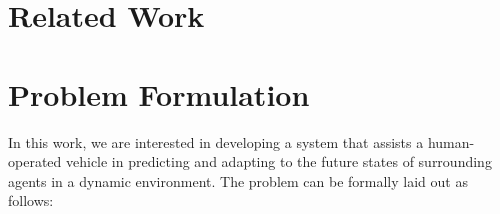 \documentclass[conference]{IEEEtran}
\begin{document}
    

\section{Related Work}

    
    
    
    
    
\section{Problem Formulation}
 
    In this work, we are interested in developing a system that assists a human-operated vehicle in predicting and adapting to the future states of surrounding agents in a dynamic environment. The problem can be formally laid out as follows:
    
\end{document}
